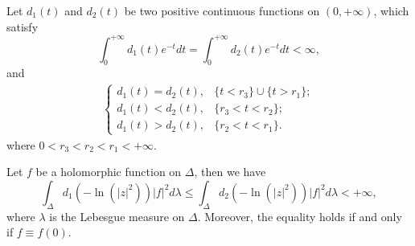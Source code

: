 \begin{lem}
  \label{l:extension.equ}
  Let $d_{1}(t)$ and $d_{2}(t)$ be two
  positive continuous functions on $(0,+\infty)$, which satisfy
    $$\int_{0}^{+\infty}d_{1}(t)e^{-t}dt=\int_{0}^{+\infty}d_{2}(t)e^{-t}dt<\infty,$$
    and 
\begin{align*}
  \begin{cases}
    d_1(t)=d_2(t), & \{t<r_{3}\}\cup\{t>r_{1}\};\\
    d_1(t)<d_2(t), & \{r_{3}<t<r_{2}\};\\
    d_1(t)>d_2(t), & \{r_{2}<t<r_{1}\}.
  \end{cases}
\end{align*}
  where $0<r_{3}<r_{2}<r_{1}<+\infty$.

  Let $f$ be a holomorphic function on $\Delta$, then we have
  $$\int_{\Delta}d_{1}(-\ln(|z|^{2}))|f|^{2}d\lambda\leq\int_{\Delta}d_{2}(-\ln(|z|^{2}))|f|^{2}d\lambda<+\infty,$$
  where $\lambda$ is the Lebesgue measure on $\Delta$. Moreover, the
  equality holds if and only if $f\equiv f(0)$.
  \end{lem}

